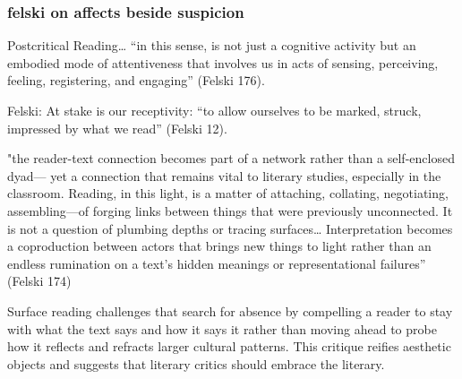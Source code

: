 \documentclass[11pt]{article}
\begin{document}
\subsubsection{felski on affects beside suspicion}
\label{sec:org908e486}



Postcritical Reading…  “in this sense, is not just a cognitive
activity but an embodied mode of attentiveness that involves us in
acts of sensing, perceiving, feeling, registering, and engaging”
(Felski 176). 

Felski: At stake is our receptivity: “to allow ourselves to be marked,
struck, impressed by what we read” (Felski 12). 

"the reader-text connection becomes part of a network rather than a
self-enclosed dyad— yet a connection that remains vital to literary
studies, especially in the classroom. Reading, in this light, is a
matter of attaching, collating, negotiating, assembling—of forging
links between things that were previously unconnected. It is not a
question of plumbing depths or tracing surfaces… Interpretation
becomes a coproduction between actors that brings new things to light
rather than an endless rumination on a text’s hidden meanings or
representational failures” (Felski 174)

Surface reading challenges that search for absence by compelling a
reader to stay with what the text says and how it says it rather than
moving ahead to probe how it reflects and refracts larger cultural
patterns. This critique reifies aesthetic objects and suggests that
literary critics should embrace the literary.
\end{document}
